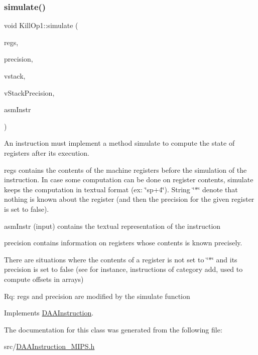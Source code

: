 \subsubsection{\texorpdfstring{simulate()}{simulate()}}
{\footnotesize\ttfamily void Kill\+Op1\+::simulate (\begin{DoxyParamCaption}\item[{vector$<$ string $>$ \&}]{regs,  }\item[{vector$<$ bool $>$ \&}]{precision,  }\item[{\hyperlink{DAAInstruction_8h_a1b0e70ac1a04f06c8132055ed01f589f}{stack\+Type} \&}]{vstack,  }\item[{\hyperlink{DAAInstruction_8h_ac5cb793e9dac3fa9693da78b7e29ab30}{stack\+Prec\+Type} \&}]{v\+Stack\+Precision,  }\item[{const string \&}]{asm\+Instr }\end{DoxyParamCaption})\hspace{0.3cm}{\ttfamily [virtual]}}

An instruction must implement a method simulate to compute the state of registers after its execution.

regs contains the contents of the machine registers before the simulation of the instruction. In case some computation can be done on register contents, simulate keeps the computation in textual format (ex\+: \char`\"{}sp+4\char`\"{}). String \char`\"{}$\ast$\char`\"{} denote that nothing is known about the register (and then the precision for the given register is set to false).

asm\+Instr (input) contains the textual representation of the instruction

precision contains information on registers whose contents is known precisely.

There are situations where the contents of a register is not set to \char`\"{}$\ast$\char`\"{} and its precision is set to false (see for instance, instructions of category add, used to compute offsets in arrays)

Rq\+: regs and precision are modified by the simulate function 

Implements \hyperlink{classDAAInstruction_a61d0b9bece1e0ead89a46c0197276324}{D\+A\+A\+Instruction}.



The documentation for this class was generated from the following file\+:\begin{DoxyCompactItemize}
\item 
src/\hyperlink{DAAInstruction__MIPS_8h}{D\+A\+A\+Instruction\+\_\+\+M\+I\+P\+S.\+h}\end{DoxyCompactItemize}

